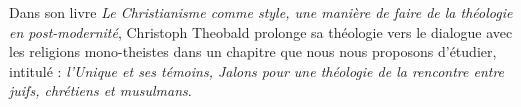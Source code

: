 

Dans son livre \textit{Le Christianisme comme style, une manière de faire de la théologie en post-modernité}\cite{theobald_christianisme_2007}, Christoph Theobald prolonge sa théologie vers le dialogue avec les religions mono-theistes dans un chapitre que nous nous proposons d'étudier, intitulé : \textit{l'Unique et ses témoins, Jalons pour une théologie de la rencontre entre juifs, chrétiens et musulmans}.  





\begin{comment}
\section{instruction}
    Rédaction d’un travail de 8 pages
Vous faites au préalable une recherche documentaire afin de choisir un article, un chapitre
d’un ouvrage ou un ouvrage dans lequel la christologie est interrogée par la culture
postmoderne et le pluralisme religieux.
Puis vous rédigez votre travail selon deux grandes parties :
\begin{itemize}
    \item  Présentez le document choisi et la manière dont l’auteur pense la confrontation de la
christologie à la culture actuelle.
    \item  Vous réagissez personnellement au texte en le discutant et le critiquant de manière
argumentée.
\end{itemize}

Le texte choisi doit être au préalable validé par le professeur
Merci de suivre les normes universitaires : « Normes de présentations de mémoires »
Votre travail écrit doit être déposé sur l’ENT (espace dédié) et la date limite pour la
remise de votre travail est le 1er mai 2023

POints d'attention : 
\begin{itemize}
    \item Christologie
    \item Récent (Grieu,...)
    \item question Ecologie ?
\end{itemize}
\end{comment} 



